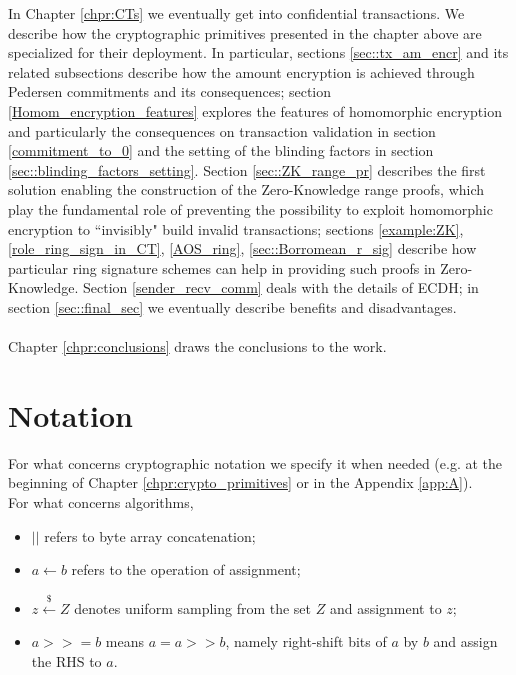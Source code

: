 In Chapter \ref{chpr:CTs} we eventually get into confidential transactions. We describe how the cryptographic primitives presented in the chapter above are specialized for their deployment. In particular, sections \ref{sec::tx_am_encr} and its related subsections describe how the amount encryption is achieved through Pedersen commitments and its consequences; section \ref{Homom_encryption_features} explores the features of homomorphic encryption and particularly the consequences on transaction validation in section \ref{commitment_to_0} and the setting of the blinding factors in section \ref{sec::blinding_factors_setting}. Section \ref{sec::ZK_range_pr} describes the first solution enabling the construction of the Zero-Knowledge range proofs, which play the fundamental role of preventing the possibility to exploit homomorphic encryption to ``invisibly" build invalid transactions; sections \ref{example:ZK}, \ref{role_ring_sign_in_CT}, \ref{AOS_ring}, \ref{sec::Borromean_r_sig} describe how particular ring signature schemes can help in providing such proofs in Zero-Knowledge. Section \ref{sender_recv_comm} deals with the details of ECDH; in section \ref{sec::final_sec} we eventually describe benefits and disadvantages.
\\ \ \\
Chapter \ref{chpr:conclusions} draws the conclusions to the work.

\section{Notation}
For what concerns cryptographic notation we specify it when needed (e.g. at the beginning of Chapter \ref{chpr:crypto_primitives} or in the Appendix \ref{app:A}). \\
For what concerns algorithms, 
\begin{itemize}
    \item $||$ refers to byte array concatenation;
	\item $a \gets b$ refers to the operation of assignment;		\item $z \xleftarrow{\text{\$}} Z$ denotes uniform sampling from the set $Z$ and assignment to $z$;
	\item $a >>= b$ means $a = a >> b$, namely right-shift bits of $a$ by $b$ and assign the RHS to $a$.
\end{itemize}